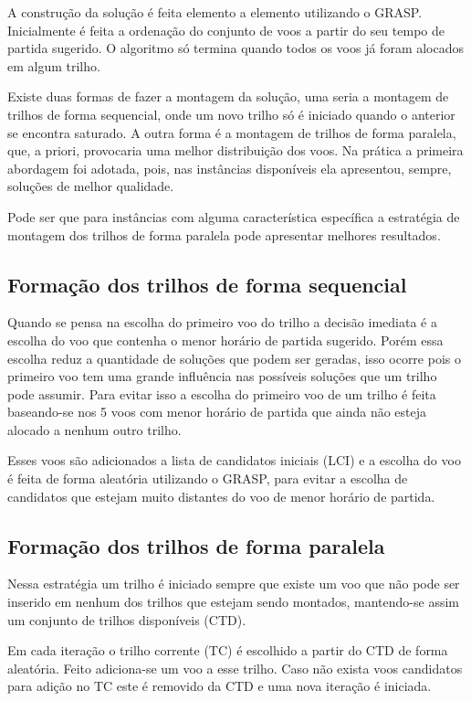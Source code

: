 A construção da solução é feita elemento a elemento utilizando o
GRASP. Inicialmente é feita a ordenação do conjunto de voos a partir do seu
tempo de partida sugerido. O algoritmo só termina quando todos os voos já
foram alocados em algum trilho.
  
Existe duas formas de fazer a montagem da solução, uma seria a montagem de
trilhos de forma sequencial, onde um novo trilho só é iniciado quando o anterior
se encontra saturado. A outra forma é a montagem de trilhos de forma paralela,
que, a priori, provocaria uma melhor distribuição dos voos. Na prática a
primeira abordagem foi adotada, pois, nas instâncias disponíveis ela apresentou,
sempre, soluções de melhor qualidade. 

Pode ser que para instâncias com alguma característica específica a
estratégia de montagem dos trilhos de forma paralela pode apresentar melhores
resultados.
  
\subsection{Formação dos trilhos de forma sequencial}

Quando se pensa na escolha do primeiro voo do trilho a decisão imediata é a
escolha do voo que contenha o menor horário de partida sugerido. Porém essa
escolha reduz a quantidade de soluções que podem ser geradas, isso ocorre pois o
primeiro voo tem uma grande influência nas possíveis soluções que um trilho pode
assumir. Para evitar isso a escolha do primeiro voo de um trilho é feita
baseando-se nos 5 voos com menor horário de partida que ainda não esteja
alocado a nenhum outro trilho. 

Esses voos são adicionados a lista de candidatos iniciais (LCI) e a escolha do
voo é feita de forma aleatória utilizando o GRASP, para evitar a escolha de
candidatos que estejam muito distantes do voo de menor horário de partida.

\subsection{Formação dos trilhos de forma paralela}
 
Nessa estratégia um trilho é iniciado sempre que existe um voo que não pode ser
inserido em nenhum dos trilhos que estejam sendo montados, mantendo-se assim um
conjunto de trilhos disponíveis (CTD).

Em cada iteração o trilho corrente (TC) é escolhido a partir do CTD de forma
aleatória. Feito adiciona-se um voo a esse trilho. Caso não exista voos
candidatos para adição no TC este é removido da CTD e uma nova iteração é
iniciada.
  
